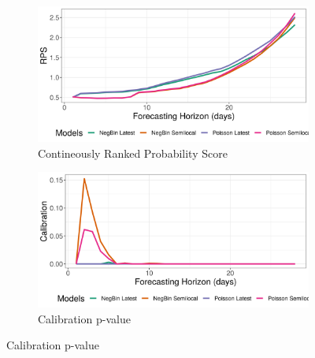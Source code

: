 \begin{figure}[H]
\begin{subfigure}{0.5\textwidth}
  \centering
  \includegraphics[width=\linewidth]{../output/Butembo_crps.png}  
  \caption{Contineously Ranked Probability Score}
  \label{Butembo_scores_1}
\end{subfigure}
\begin{subfigure}{0.5\textwidth}
  \centering
  \includegraphics[width=\linewidth]{../output/Butembo_calibration.png}  
  \caption{Calibration p-value}
  \label{Butembo_scores_2}
\end{subfigure}


\end{figure}
